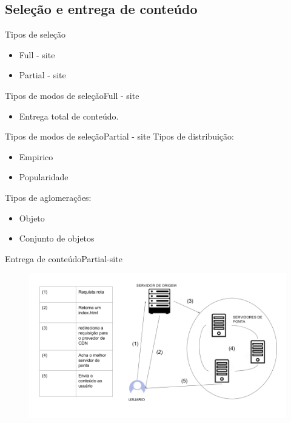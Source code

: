 \documentclass{beamer}
\begin{document}
\subsection{Sele\c{c}\~ao e entrega de conte\'udo}
\begin{frame}{Tipos de sele\c{c}\~ao}
\begin{itemize}
	\item Full - site
	\item Partial - site
\end{itemize}
\end{frame}
\begin{frame}{Tipos de modos de sele\c{c}\~ao}{Full - site}
\begin{itemize}
	\item Entrega total de conte\'udo.
\end{itemize}
\end{frame}
\begin{frame}{Tipos de modos de sele\c{c}\~ao}{Partial - site}
Tipos de distribui\c{c}\~ao:
\begin{itemize}
	\item Empirico
	\item Popularidade
\end{itemize}
Tipos de aglomera\c{c}\~oes:
\begin{itemize}
	\item Objeto
	\item Conjunto de objetos
\end{itemize}
\end{frame}
\begin{frame}{Entrega de conte\'udo}{Partial-site}
\begin{figure} 
\includegraphics[width=13cm]{Figuras/entrega_conteudo.png} 
\label{figura:entrega_conteudo}
\end{figure}
\end{frame}
\end{document}

